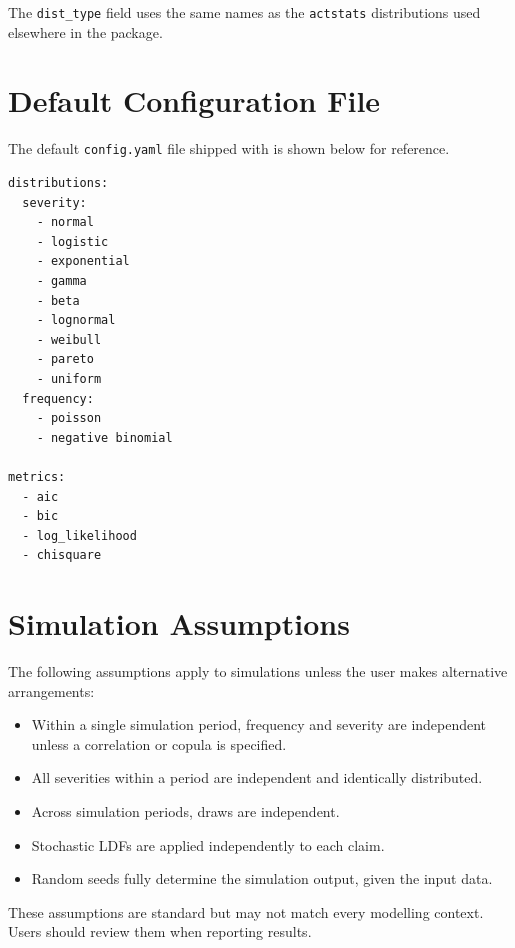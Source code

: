 The \texttt{dist\_type} field uses the same names as the
\texttt{actstats} distributions used elsewhere in the package.

\section{Default Configuration File}
\label{app:default_config}

The default \texttt{config.yaml} file shipped with \actsim is shown
below for reference.

\begin{lstlisting}[style=bashstyle]
distributions:
  severity:
    - normal
    - logistic
    - exponential
    - gamma
    - beta
    - lognormal
    - weibull
    - pareto
    - uniform
  frequency:
    - poisson
    - negative binomial

metrics:
  - aic
  - bic
  - log_likelihood
  - chisquare
\end{lstlisting}

\section{Simulation Assumptions}
\label{app:assumptions}

The following assumptions apply to \actsim simulations unless the user
makes alternative arrangements:

\begin{itemize}[leftmargin=*]
    \item Within a single simulation period, frequency and severity are
          independent unless a correlation or copula is specified.
    \item All severities within a period are independent and
          identically distributed.
    \item Across simulation periods, draws are independent.
    \item Stochastic LDFs are applied independently to each claim.
    \item Random seeds fully determine the simulation output, given
          the input data.
\end{itemize}

These assumptions are standard but may not match every modelling
context. Users should review them when reporting results.

